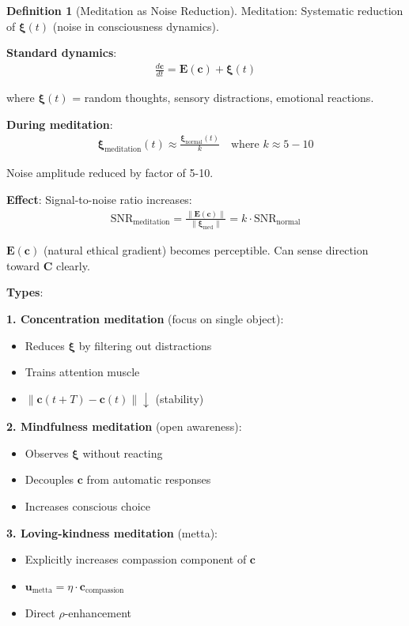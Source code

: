 \documentclass[11pt,a4paper]{article}
\theoremstyle{definition}
\newtheorem{definition}{Definition}[section]
\theoremstyle{remark}
\newcommand{\EE}{\mathbf{E}}
\newcommand{\cc}{\mathbf{c}}
\begin{document}
\begin{enumerate}
\begin{protocol}
\begin{definition}[Meditation as Noise Reduction]
Meditation: Systematic reduction of \(\boldsymbol{\xi}(t)\) (noise in consciousness dynamics).

\textbf{Standard dynamics}:
\begin{align}
\frac{d\cc}{dt} = \EE(\cc) + \boldsymbol{\xi}(t)
\end{align}

where \(\boldsymbol{\xi}(t)\) = random thoughts, sensory distractions, emotional reactions.

\textbf{During meditation}:
\begin{align}
\boldsymbol{\xi}_{\text{meditation}}(t) \approx \frac{\boldsymbol{\xi}_{\text{normal}}(t)}{k} \quad \text{where } k \approx 5-10
\end{align}

Noise amplitude reduced by factor of 5-10.

\textbf{Effect}: Signal-to-noise ratio increases:
\begin{align}
\text{SNR}_{\text{meditation}} = \frac{\|\EE(\cc)\|}{\|\boldsymbol{\xi}_{\text{med}}\|} = k \cdot \text{SNR}_{\text{normal}}
\end{align}

\(\EE(\cc)\) (natural ethical gradient) becomes perceptible. Can sense direction toward \(\mathbf{C}\) clearly.

\textbf{Types}:

\textbf{1. Concentration meditation} (focus on single object):
\begin{itemize}
    \item Reduces \(\boldsymbol{\xi}\) by filtering out distractions
    \item Trains attention muscle
    \item \(\|\cc(t+T) - \cc(t)\| \downarrow\) (stability)
\end{itemize}

\textbf{2. Mindfulness meditation} (open awareness):
\begin{itemize}
    \item Observes \(\boldsymbol{\xi}\) without reacting
    \item Decouples \(\cc\) from automatic responses
    \item Increases conscious choice
\end{itemize}

\textbf{3. Loving-kindness meditation} (metta):
\begin{itemize}
    \item Explicitly increases compassion component of \(\cc\)
    \item \(\mathbf{u}_{\text{metta}} = \eta \cdot \mathbf{c}_{\text{compassion}}\)
    \item Direct \(\rho\)-enhancement
\end{itemize}
\end{definition}


\end{protocol}
\end{enumerate}
\end{document}
